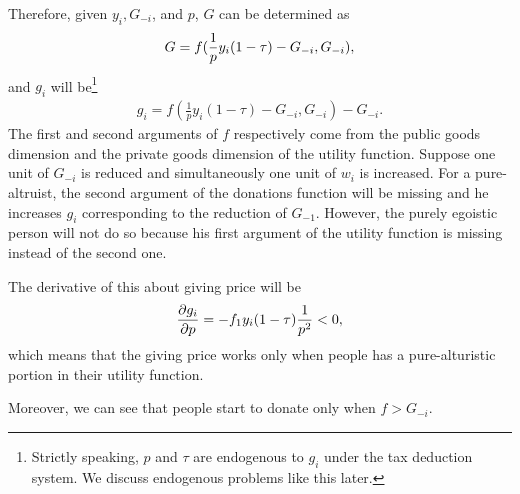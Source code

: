 \documentclass[
  11pt,
  a4paper,
]{article}
\begin{document}
Therefore, given \(y_i, G_{-i}\), and \(p\), \(G\) can be determined as
\begin{align}
 G=f(\frac1{p}y_i(1-\tau)-G_{-i},G_{-i}),\notag
\end{align}
and \(g_i\) will be\footnote{Strictly speaking, $p$ and $\tau$ are endogenous to $g_i$ under the tax deduction system. We discuss endogenous problems like this later.}
\begin{align}
g_i=f(\frac1{p}y_i(1-\tau)-G_{-i},G_{-i})-G_{-i}.\label{g}
\end{align}
The first and second arguments of \(f\) respectively come from the public goods dimension and the private goods dimension of the utility function. Suppose one unit of \(G_{-i}\) is reduced and simultaneously one unit of \(w_i\) is increased. For a pure-altruist, the second argument of the donations function will be missing and he increases \(g_i\) corresponding to the reduction of \(G_{-1}\). However, the purely egoistic person will not do so because his first argument of the utility function is missing instead of the second one.

The derivative of this about giving price will be
\begin{align}
\frac{\partial g_i}{\partial p}=-f_1y_i(1-\tau)\frac1{p^2}<0\notag,
\end{align}
which means that the giving price works only when people has a pure-alturistic portion in their utility function.

Moreover, we can see that people start to donate only when \(f>G_{-i}\).
\end{document}
